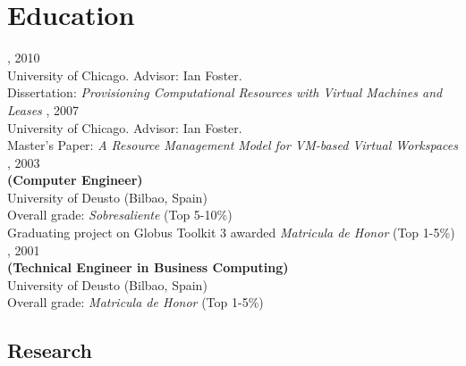 \documentclass{resume}
\begin{document}
\section*{\hspace{-1cm}Education}
\begin{category}{}
, 2010\\
University of Chicago. Advisor: Ian Foster.\\
Dissertation: \emph{Provisioning Computational Resources with Virtual Machines and Leases} 
, 2007\\
University of Chicago. Advisor: Ian Foster.\\
Master's Paper: \emph{A Resource Management Model for VM-based Virtual Workspaces} 
, 2003\\
\textbf{(Computer Engineer)}\\
University of Deusto (Bilbao, Spain)\\
Overall grade: \emph{Sobresaliente} (Top 5-10\%)\\
Graduating project on Globus Toolkit 3 awarded \emph{Matricula de Honor} (Top 1-5\%)  
, 2001\\
\textbf{(Technical Engineer in Business Computing)}\\
University of Deusto (Bilbao, Spain)\\
Overall grade: \emph{Matricula de Honor} (Top 1-5\%)\\
\end{category}



\pagebreak





\begin{center}
\section*{\huge Research}
\vspace{2ex}
\end{center}
\end{document}
